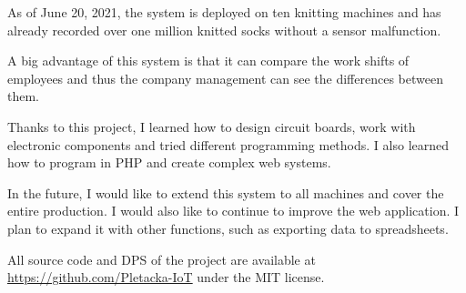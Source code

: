 \documentclass[12pt, a4paper]{article}
\begin{document}
As of June 20, 2021, the system is deployed on ten knitting machines and has already recorded over one million knitted socks without a sensor malfunction.

A big advantage of this system is that it can compare the work shifts of employees and thus the company management can see the differences between them.

Thanks to this project, I learned how to design circuit boards, work with electronic components and tried different programming methods.
I also learned how to program in PHP and create complex web systems.

In the future, I would like to extend this system to all machines and cover the entire production.
I would also like to continue to improve the web application. I plan to expand it with other functions, such as exporting data to spreadsheets.

All source code and DPS of the project are available at \url{https://github.com/Pletacka-IoT} under the MIT license.


\newpage





\appendix
\end{document}
